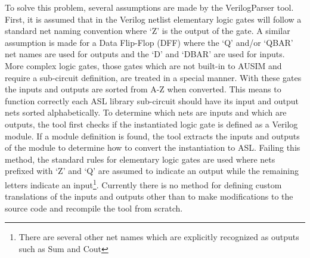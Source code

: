 \documentclass[12pt]{report}
\begin{document}
To solve this problem, several assumptions are made by the VerilogParser tool.  First, it is assumed that in the Verilog netlist elementary logic gates will follow a standard net naming convention where `Z' is the output of the gate.  A similar assumption is made for a Data Flip-Flop (DFF) where the `Q' and/or `QBAR' net names are used for outputs and the `D' and `DBAR' are used for inputs.  More complex logic gates, those gates which are not built-in to AUSIM and require a sub-circuit definition, are treated in a special manner.  With these gates the inputs and outputs are sorted from A-Z when converted.  This means to function correctly each ASL library sub-circuit should have its input and output nets sorted alphabetically.  To determine which nets are inputs and which are outputs, the tool first checks if the instantiated logic gate is defined as a Verilog module.  If a module definition is found, the tool extracts the inputs and outputs of the module to determine how to convert the instantiation to ASL.  Failing this method, the standard rules for elementary logic gates are used where nets prefixed with `Z' and `Q' are assumed to indicate an output while the remaining letters indicate an input\footnote{There are several other net names which are explicitly recognized as outputs such as Sum and Cout}.  Currently there is no method for defining custom translations of the inputs and outputs other than to make modifications to the source code and recompile the tool from scratch.
\end{document}
